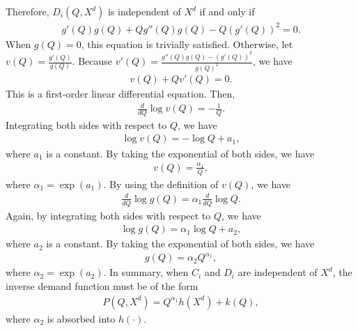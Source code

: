 \documentclass[11pt, a4paper]{article}
\theoremstyle{remark}
\begin{document}
Therefore, $D_i(Q, X^{d})$ is independent of $X^{d}$ if and only if
\begin{align}
    g'(Q)g(Q) + Qg{''}(Q)g(Q) - Q (g'(Q))^{2} = 0.
\end{align}
When $g(Q) = 0$, this equation is trivially satisfied.
Otherwise, let $v(Q) = \frac{g'(Q)}{g(Q)}$.
Because $v'(Q) = \frac{g''(Q)g(Q) - (g'(Q))^2}{g(Q)^2}$, we have
\begin{align}
    v(Q) + Qv'(Q) = 0.
\end{align}
This is a first-order linear differential equation.
Then, 
\begin{align}
    \frac{d }{d Q}\log v(Q) = -\frac{1}{Q}.
\end{align}
Integrating both sides with respect to $Q$, we have
\begin{align}
    \log v(Q) = -\log Q + a_1,
\end{align}
where $a_1$ is a constant.
By taking the exponential of both sides, we have
\begin{align}
    v(Q) = \frac{\alpha_1}{Q}, 
\end{align}
where $\alpha_1 = \exp(a_1)$.
By using the definition of $v(Q)$, we have
\begin{align}
    \frac{d }{d Q}\log g(Q) = \alpha_1\frac{d}{dQ}\log Q.
\end{align}
Again, by integrating both sides with respect to $Q$, we have
\begin{align}
    \log g(Q) = \alpha_1\log Q + a_2,
\end{align}
where $a_2$ is a constant.
By taking the exponential of both sides, we have
\begin{align}
    g(Q) = \alpha_2Q^{\alpha_1},
\end{align}
where $\alpha_2 = \exp(a_2)$.
In summary, when $C_i$ and $D_i$ are independent of $X^{d}$, the inverse demand function must be of the form
\begin{align}
    P(Q, X^{d}) = Q^{\alpha_1}h(X^{d}) + k(Q),
\end{align}
where $\alpha_2$ is absorbed into $h(\cdot)$.
\end{document}
